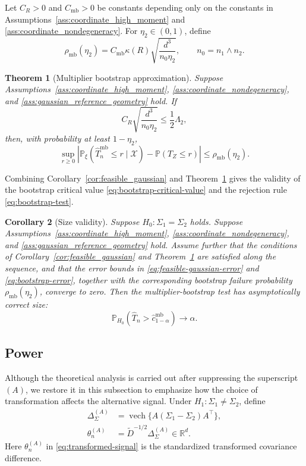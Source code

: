 \documentclass[
  12pt]{article}
\theoremstyle{plain}
\newtheorem{theorem}{Theorem}[section]
\newtheorem{corollary}[theorem]{Corollary}
\theoremstyle{definition}
\theoremstyle{remark}
\begin{document}
Let \(C_R>0\) and \(C_{\mathrm{mb}}>0\) be constants depending only on the
constants in Assumptions~\ref{ass:coordinate_high_moment} and
\ref{ass:coordinate_nondegeneracy}.  For \(\eta_2\in(0,1)\), define
\begin{equation}
\label{eq:bootstrap-error}
\rho_{\mathrm{mb}}(\eta_2)
=
C_{\mathrm{mb}}\kappa(R)
\sqrt{\frac{d^3}{n_0\eta_2}},
\qquad
n_0=n_1\wedge n_2 .
\end{equation}

\begin{theorem}[Multiplier bootstrap approximation]
\label{thm:bootstrap_explicit}
Suppose Assumptions~\ref{ass:coordinate_high_moment},
\ref{ass:coordinate_nondegeneracy}, and
\ref{ass:gaussian_reference_geometry} hold.  If
\[
C_R\sqrt{\frac{d^3}{n_0\eta_2}}
\le
\frac12\Lambda_2,
\]
then, with probability at least \(1-\eta_2\),
\[
\sup_{r\ge0}
\left|
\mathbb P_\xi
\left(
\widehat T_n^{\mathrm{mb}}\le r\mid\mathcal X
\right)
-
\mathbb P(T_Z\le r)
\right|
\le
\rho_{\mathrm{mb}}(\eta_2).
\]
\end{theorem}

Combining Corollary~\ref{cor:feasible_gaussian} and
Theorem~\ref{thm:bootstrap_explicit} gives the validity of the bootstrap
critical value \eqref{eq:bootstrap-critical-value} and the rejection rule
\eqref{eq:bootstrap-test}.

\begin{corollary}[Size validity]
\label{cor:size_validity}
Suppose \(H_0:\Sigma_1=\Sigma_2\) holds.  Suppose
Assumptions~\ref{ass:coordinate_high_moment},
\ref{ass:coordinate_nondegeneracy}, and
\ref{ass:gaussian_reference_geometry} hold.  Assume further that the
conditions of Corollary~\ref{cor:feasible_gaussian} and
Theorem~\ref{thm:bootstrap_explicit} are satisfied along the sequence, and
that the error bounds in \eqref{eq:feasible-gaussian-error} and
\eqref{eq:bootstrap-error}, together with the corresponding bootstrap failure
probability $\rho_{\mathrm{mb}}(\eta_2)$, converge to zero.  Then the multiplier-bootstrap test
has asymptotically correct size:
\[
\mathbb P_{H_0}
\left(
\widehat T_n>\widehat c_{1-\alpha}^{\mathrm{mb}}
\right)
\to \alpha.
\]
\end{corollary}

\subsection{Power}
\label{subsec:power}

Although the theoretical analysis is carried out after suppressing the
superscript \((A)\), we restore it in this subsection to emphasize how the
choice of transformation affects the alternative signal.  Under
\(H_1:\Sigma_1\neq\Sigma_2\), define
\begin{equation}
\label{eq:transformed-signal}
\begin{aligned}
\Delta_\Sigma^{(A)}
&=
\operatorname{vech}\{A(\Sigma_1-\Sigma_2)A^\top\},\\
\theta_n^{(A)}
&=
\widetilde D^{-1/2}\Delta_\Sigma^{(A)}
\in\mathbb R^d .
\end{aligned}
\end{equation}
Here \(\theta_n^{(A)}\) in \eqref{eq:transformed-signal} is the standardized
transformed covariance difference.
\end{document}
